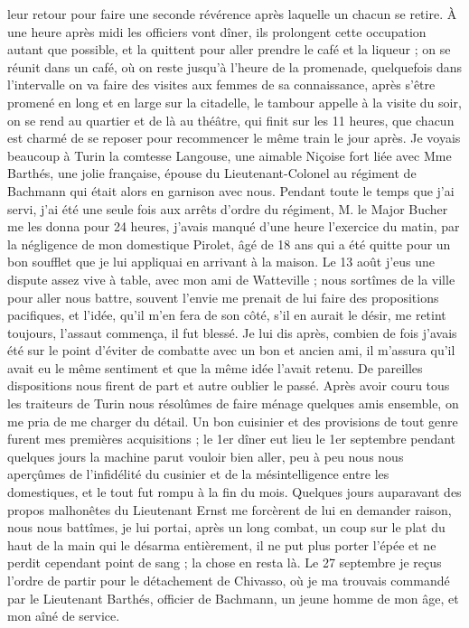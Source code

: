 \documentclass[12pt]{article}
\begin{document}
 leur retour pour faire une seconde révérence après
laquelle un chacun se retire. À une heure après midi les officiers vont dîner, ils prolongent cette
occupation autant que possible, et la quittent pour aller prendre le café et la liqueur ; on se
réunit dans un café, où on reste jusqu’à l’heure de la promenade, quelquefois dans l’intervalle on
va faire des visites aux femmes de sa connaissance, après s’être promené en long et en large sur la
citadelle, le tambour appelle à la visite du soir, on se rend au quartier et de là au théâtre, qui
finit sur les 11 heures, que chacun est charmé de se reposer pour recommencer le même train le jour
après. Je voyais beaucoup à Turin la comtesse Langouse, une aimable Niçoise fort liée avec Mme
Barthés, une jolie française, épouse du Lieutenant-Colonel au régiment de Bachmann qui était alors
en garnison avec nous. Pendant toute le temps que j’ai servi, j’ai été une seule fois aux arrêts
d’ordre du régiment, M. le Major Bucher me les donna pour 24 heures, j’avais manqué d’une heure
l’exercice du matin, par la négligence de mon domestique Pirolet, âgé de 18 ans qui a été quitte
pour un bon soufflet que je lui appliquai en arrivant à la maison. Le 13 août j’eus une dispute
assez vive à table, avec mon ami de Watteville ; nous sortîmes de la ville pour aller nous battre,
souvent l’envie me prenait de lui faire des propositions pacifiques, et l’idée, qu’il m’en fera de
son côté, s’il en aurait le désir, me retint toujours, l’assaut commença, il fut blessé. Je lui dis
après, combien de fois j’avais été sur le point d’éviter de combatte avec un bon et ancien ami, il
m’assura qu’il avait eu le même sentiment et que la même idée l’avait retenu. De pareilles
dispositions nous firent de part et autre oublier le passé. Après avoir couru tous les traiteurs de
Turin nous résolûmes de faire ménage quelques amis ensemble, on me pria de me charger du détail. Un
bon cuisinier et des provisions de tout genre furent mes premières acquisitions ; le 1er dîner eut
lieu le 1er septembre pendant quelques jours la machine parut vouloir bien aller, peu à peu nous
nous aperçûmes de l’infidélité du cusinier et de la mésintelligence entre les domestiques, et le
tout fut rompu à la fin du mois. Quelques jours auparavant des propos malhonêtes du Lieutenant Ernst
me forcèrent de lui en demander raison, nous nous battîmes, je lui portai, après un long combat, un
coup sur le plat du haut de la main qui le désarma entièrement, il ne put plus porter l’épée et ne
perdit cependant point de sang ; la chose en resta là. Le 27 septembre je reçus l’ordre de partir
pour le détachement de Chivasso, où je ma trouvais commandé par le Lieutenant Barthés, officier de
Bachmann, un jeune homme de mon âge, et mon aîné de service.
\end{document}
